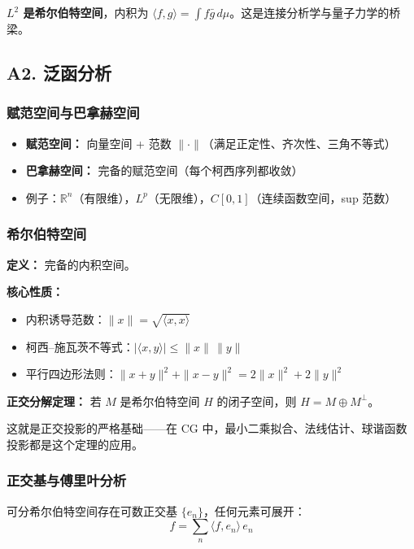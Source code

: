 \textbf{$L^2$ 是希尔伯特空间}，内积为 $\langle f, g \rangle = \int f\bar{g}\,d\mu$。这是连接分析学与量子力学的桥梁。

\subsection{A2. 泛函分析}

\subsubsection{赋范空间与巴拿赫空间}

\begin{itemize}
  \item \textbf{赋范空间：} 向量空间 + 范数 $\|\cdot\|$（满足正定性、齐次性、三角不等式）
  \item \textbf{巴拿赫空间：} 完备的赋范空间（每个柯西序列都收敛）
  \item 例子：$\mathbb{R}^n$（有限维），$L^p$（无限维），$C[0,1]$（连续函数空间，sup 范数）
\end{itemize}

\subsubsection{希尔伯特空间}

\textbf{定义：} 完备的内积空间。

\textbf{核心性质：}
\begin{itemize}
  \item 内积诱导范数：$\|x\| = \sqrt{\langle x, x \rangle}$
  \item 柯西--施瓦茨不等式：$|\langle x, y \rangle| \leq \|x\|\,\|y\|$
  \item 平行四边形法则：$\|x+y\|^2 + \|x-y\|^2 = 2\|x\|^2 + 2\|y\|^2$
\end{itemize}

\textbf{正交分解定理：} 若 $M$ 是希尔伯特空间 $H$ 的闭子空间，则 $H = M \oplus M^\perp$。

这就是正交投影的严格基础——在 CG 中，最小二乘拟合、法线估计、球谐函数投影都是这个定理的应用。

\subsubsection{正交基与傅里叶分析}

可分希尔伯特空间存在可数正交基 $\{e_n\}$，任何元素可展开：
\[
f = \sum_{n} \langle f, e_n \rangle\, e_n
\]


